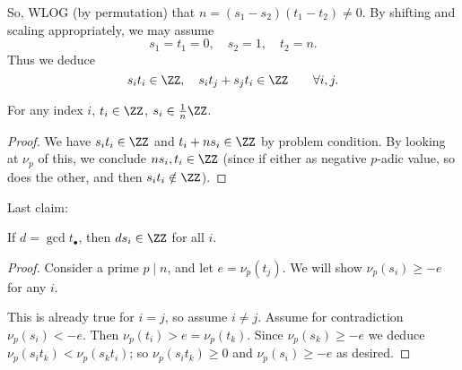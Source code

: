\documentclass[11pt]{scrartcl}
\begin{document}
So, WLOG (by permutation) that $n = (s_1-s_2)(t_1-t_2) \neq 0$.
By shifting and scaling appropriately,
we may assume
\[ s_1 = t_1 = 0, \quad s_2 = 1, \quad t_2 = n. \]
Thus we deduce \[ s_i t_i \in \ZZ, \quad s_i t_j + s_j t_i \in \ZZ
  \qquad \forall i,j. \]

\begin{claim*}
  For any index $i$,
  $t_i \in \ZZ$, $s_i \in \frac 1n \ZZ$.
\end{claim*}
\begin{proof}
  We have $s_i t_i \in \ZZ$
  and $t_i + n s_i \in \ZZ$ by problem condition.
  By looking at $\nu_p$ of this,
  we conclude $ns_i, t_i \in \ZZ$
  (since if either as negative $p$-adic value,
  so does the other, and then $s_i t_i \notin \ZZ$).
\end{proof}

Last claim:
\begin{claim*}
  If $d = \gcd t_\bullet$, then $ds_i \in \ZZ$ for all $i$.
\end{claim*}
\begin{proof}
  Consider a prime $p \mid n$, and let $e = \nu_p(t_j)$.
  We will show $\nu_p(s_i) \ge -e$ for any $i$.

  This is already true for $i = j$,
  so assume $i \neq j$.
  Assume for contradiction $\nu_p(s_i) < -e$.
  Then $\nu_p(t_i) > e = \nu_p(t_k)$.
  Since $\nu_p(s_k) \ge -e$ we deduce
  $\nu_p(s_i t_k) < \nu_p(s_k t_i)$;
  so $\nu_p(s_i t_k) \ge 0$ and $\nu_p(s_i) \ge -e$ as desired.
\end{proof}
\pagebreak
\end{document}

